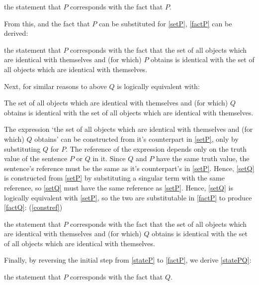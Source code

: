 	\begin{example} \label{stateP}
	the statement that $P$ corresponds with the fact that $P$.
	\end{example}

From this, and the fact that $P$ can be substituted for \ref{setP}, \ref{factP} can be derived:

	\begin{example} \label{factP}
	the statement that $P$ corresponds with the fact that the set of all objects which are identical with themselves and (for which) $P$ obtains is identical with the set of all objects which are identical with themselves.
	\end{example}

Next, for similar reasons to above $Q$ is logically equivalent with:

	\begin{example} \label{setQ}
	The set of all objects which are identical with themselves and (for which) $Q$ obtains is identical with the set of all objects which are identical with themselves.
	\end{example}

The expression `the set of all objects which are identical with themselves and (for which) $Q$ obtains' can be constructed from it's counterpart in \ref{setP}, only by substituting $Q$ for $P$.
The reference of the expression depends only on the truth value of the sentence $P$ or $Q$ in it.
Since $Q$ and $P$ have the same truth value, the sentence's reference must be the same as it's counterpart's in \ref{setP}.
Hence, \ref{setQ} is constructed from \ref{setP} by substituting a singular term with the same reference, so \ref{setQ} must have the same reference as \ref{setP}.
Hence, \ref{setQ} is logically equivalent with \ref{setP}, so the two are substitutable in \ref{factP} to produce \ref{factQ}:
(\ref{constref})


	\begin{example} \label{factQ}
	the statement that $P$ corresponds with the fact that the set of all objects which are identical with themselves and (for which) $Q$ obtains is identical with the set of all objects which are identical with themselves.
	\end{example}

Finally, by reversing the initial step from \ref{stateP} to \ref{factP}, we derive \ref{statePQ}:

	\begin{example} \label{statePQ}
	the statement that $P$ corresponds with the fact that $Q$.
	\end{example}

